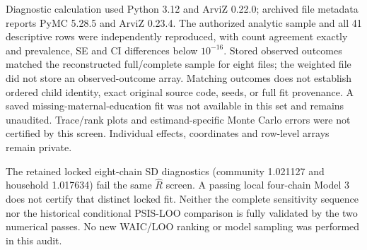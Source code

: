 \documentclass[10pt]{article}
\begin{document}
Diagnostic calculation used Python 3.12 and ArviZ 0.22.0; archived file metadata reports PyMC 5.28.5 and ArviZ 0.23.4. The authorized analytic sample and all 41 descriptive rows were independently reproduced, with count agreement exactly and prevalence, SE and CI differences below $10^{-16}$. Stored observed outcomes matched the reconstructed full/complete sample for eight files; the weighted file did not store an observed-outcome array. Matching outcomes does not establish ordered child identity, exact original source code, seeds, or full fit provenance. A saved missing-maternal-education fit was not available in this set and remains unaudited. Trace/rank plots and estimand-specific Monte Carlo errors were not certified by this screen. Individual effects, coordinates and row-level arrays remain private.

The retained locked eight-chain SD diagnostics (community 1.021127 and household 1.017634) fail the same $\hat R$ screen. A passing local four-chain Model 3 does not certify that distinct locked fit. Neither the complete sensitivity sequence nor the historical conditional PSIS-LOO comparison is fully validated by the two numerical passes. No new WAIC/LOO ranking or model sampling was performed in this audit.
\end{document}
